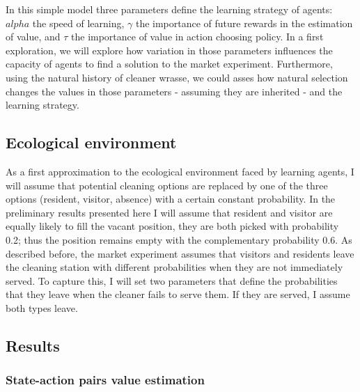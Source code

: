 \documentclass{article}
\begin{document}
In this simple model three parameters define the learning strategy of agents: $alpha$ the speed of learning, $\gamma$ the importance of future rewards in the estimation of value, and $\tau$ the importance of value in action choosing policy. In a first exploration, we will explore how variation in those parameters influences the capacity of agents to find a solution to the market experiment. Furthermore, using the natural history of cleaner wrasse, we could asses how natural selection changes the values in those parameters - assuming they are inherited - and the learning strategy. 

\subsection*{Ecological environment}

As a first approximation to the ecological environment faced by learning agents, I will assume that potential cleaning options are replaced by one of the three options (resident, visitor, absence) with a certain constant probability. In the preliminary results presented here I will assume that resident and visitor are equally likely to fill the vacant position, they are both picked with probability 0.2; thus the position remains empty with the complementary probability 0.6. As described before, the market experiment assumes that visitors and residents leave the cleaning station with different probabilities when they are not immediately served. To capture this, I will set two parameters that define the probabilities that they leave when the cleaner fails to serve them. If they are served, I assume both types leave. 

\subsection*{Results}
\subsubsection{State-action pairs value estimation}
\end{document}
